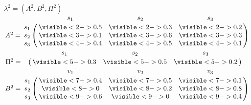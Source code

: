 \begin{frame}
\begin{columns}[T]
    $\lambda^{2}=(A^{2},B^{2},\Pi^{2})$\\\vspace*{1em}%
    $A^{2} = \bordermatrix{~ & s_1 &
      s_2 & s_3 \cr s_1 &     \visible<2->{0.5} & \visible<2->{0.3} & \visible<2->{0.2} \cr s_2 &
      \visible<3->{0.1} & \visible<3->{0.6} & \visible<3->{0.3}
      \cr s_3 & \visible<4->{0.4} & \visible<4->{0.5} &
      \visible<4->{0.1} \cr}$\\\vspace*{1em}%
    $\Pi^{2} = \bordermatrix{ ~ & s_1 & s_2 & s_3 \cr ~ 
      & \visible<5->{0.3} & \visible<5->{0.5} & \visible<5->{0.2} \cr}$\\\vspace*{1em}%
    $B^{2} = \bordermatrix{~ & v_1 &
      v_2 & v_3 \cr s_1 & \visible<7->{0.4} & \visible<7->{0.5} & \visible<7->{0.1} \cr s_2 &
          \visible<8->{0} & \visible<8->{0.2} & \visible<8->{0.8}
          \cr s_3 & \visible<9->{0.6} & \visible<9->{0} &
          \visible<9->{0.4} \cr}$
  \end{columns}%
\end{frame}%

